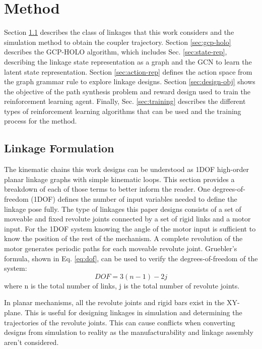\section{Method}
Section \ref{sec:linkage-form} describes the class of linkages that this work considers and the simulation method to obtain the coupler trajectory. Section \ref{sec:gcp-holo} describes the GCP-HOLO algorithm, which includes Sec. \ref{sec:state-rep}, describing the linkage state representation as a graph and the GCN to learn the latent state representation. Section \ref{sec:action-rep} defines the action space from the graph grammar rule to explore linkage designs. Section \ref{sec:design-obj} shows the objective of the path synthesis problem and reward design used to train the reinforcement learning agent. Finally, Sec. \ref{sec:training} describes the different types of reinforcement learning algorithms that can be used and the training process for the method.

\subsection{Linkage Formulation}\label{sec:linkage-form}
The kinematic chains this work designs can be understood as 1DOF high-order planar linkage graphs with simple kinematic loops. This section provides a breakdown of each of those terms to better inform the reader. One degrees-of-freedom (1DOF) defines the number of input variables needed to define the linkage pose fully. The type of linkages this paper designs consists of a set of moveable and fixed revolute joints connected by a set of rigid links and a motor input. For the 1DOF system knowing the angle of the motor input is sufficient to know the position of the rest of the mechanism. A complete revolution of the motor generates periodic paths for each moveable revolute joint. Gruebler’s formula, shown in Eq. \eqref{eq:dof}, can be used to verify the degrees-of-freedom of the system:
\begin{equation}\label{eq:dof}
    DOF = 3(n-1)-2j
\end{equation}
where n is the total number of links, j is the total number of revolute joints.

In planar mechanisms, all the revolute joints and rigid bars exist in the XY-plane. This is useful for designing linkages in simulation and determining the trajectories of the revolute joints. This can cause conflicts when converting designs from simulation to reality as the manufacturability and linkage assembly aren’t considered.

